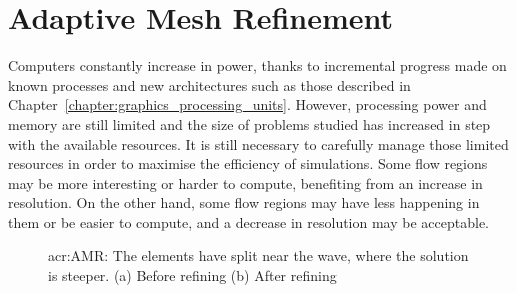 \chapter{Adaptive Mesh Refinement}\label{chapter:adaptive_mesh_refinement} 

Computers constantly increase in power, thanks to incremental progress made on known processes and
new architectures such as those described in Chapter~\ref{chapter:graphics_processing_units}.
However, processing power and memory are still limited and the size of problems studied has
increased in step with the available resources. It is still necessary to carefully manage those
limited resources in order to maximise the efficiency of simulations. Some flow regions may be more
interesting or harder to compute, benefiting from an increase in resolution. On the other hand, some
flow regions may have less happening in them or be easier to compute, and a decrease in resolution
may be acceptable.

\begin{figure}[H]
	\centering
	\hfill
	\caption{\Acrlong{acr:AMR}: The elements have split near the wave, where the solution is steeper. (a) Before refining (b) After refining}\label{fig:mesh_refinement}
\end{figure}

